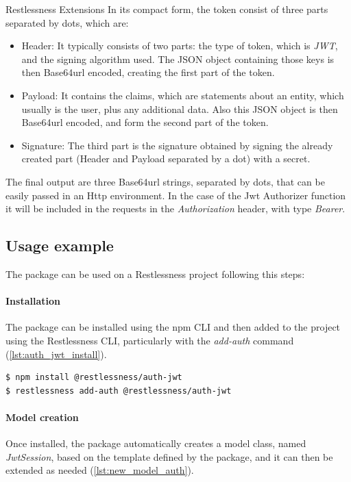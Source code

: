 \begin{chapter}{Restlessness Extensions}
    In its compact form, the token consist of three parts separated by dots,
    which are:
    \begin{itemize}
        \item Header: It typically consists of two parts: the type of token, which
            is \textit{JWT}, and the signing algorithm used. The JSON object
            containing those keys is then Base64url encoded, creating the first
            part of the token.
        \item Payload: It contains the claims, which are statements about an entity,
            which usually is the user, plus any additional data. Also this JSON
            object is then Base64url encoded, and form the second part of the token.
        \item Signature: The third part is the signature obtained by signing the
            already created part (Header and Payload separated by a dot) with a
            secret.
    \end{itemize}
    The final output are three Base64url strings, separated by dots, that can be
    easily passed in an Http environment. In the case of the Jwt Authorizer function
    it will be included in the requests in the \textit{Authorization} header,
    with type \textit{Bearer}.

    \subsection{Usage example}
    The package can be used on a Restlessness project following this steps:

    \paragraph{Installation}
    The package can be installed using the npm CLI and then added to the project
    using the Restlessness CLI, particularly with the \textit{add-auth} command
    (\ref{lst:auth_jwt_install}).

    \bigskip
    \begin{lstlisting}[caption=auth-jwt installation, label={lst:auth_jwt_install}]
$ npm install @restlessness/auth-jwt
$ restlessness add-auth @restlessness/auth-jwt
    \end{lstlisting}

    \paragraph{Model creation}
    Once installed, the package automatically creates a model class, named
    \textit{JwtSession}, based on the template defined by the package, and it can
    then be extended as needed (\ref{lst:new_model_auth}).


\end{chapter}
